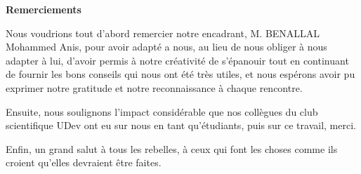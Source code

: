 \thispagestyle{empty}


\vspace*{5cm}

\begin{center}
\textbf{Remerciements}
\end{center}

Nous voudrions tout d’abord remercier notre encadrant, M. BENALLAL Mohammed Anis, pour avoir adapté a nous, au lieu de nous obliger à nous adapter à lui, d’avoir permis à notre créativité de s’épanouir tout en continuant de fournir les bons conseils qui nous ont été très utiles, et nous espérons avoir pu exprimer notre gratitude et notre reconnaissance à chaque rencontre.\medskip

Ensuite, nous soulignons l’impact considérable que nos collègues du club scientifique UDev ont eu sur nous en tant qu’étudiants, puis sur ce travail, merci.\medskip

Enfin, un grand salut à tous les rebelles, à ceux qui font les choses comme ils croient qu'elles devraient être faites.